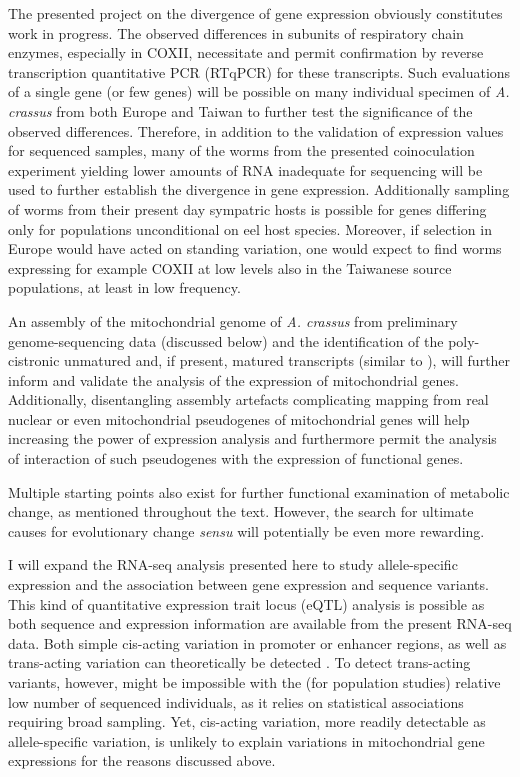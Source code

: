 The presented project on the divergence of gene expression obviously
constitutes work in progress. The observed differences in subunits of
respiratory chain enzymes, especially in COXII, necessitate and permit
confirmation by reverse transcription quantitative PCR (RTqPCR) for
these transcripts. Such evaluations of a single gene (or few genes)
will be possible on many individual specimen of \textit{A. crassus}
from both Europe and Taiwan to further test the significance of the
observed differences. Therefore, in addition to the validation of
expression values for sequenced samples, many of the worms from the
presented coinoculation experiment yielding lower amounts of RNA
inadequate for sequencing will be used to further establish the
divergence in gene expression. Additionally sampling of worms from
their present day sympatric hosts is possible for genes differing only
for populations unconditional on eel host species. Moreover, if
selection in Europe would have acted on standing variation, one would
expect to find worms expressing for example COXII at low levels also
in the Taiwanese source populations, at least in low frequency.

An assembly of the mitochondrial genome of \textit{A. crassus} from
preliminary genome-sequencing data (discussed below) and the
identification of the poly-cistronic unmatured and, if present,
matured transcripts (similar to \cite{pmid19843606}), will further
inform and validate the analysis of the expression of mitochondrial
genes. Additionally, disentangling assembly artefacts complicating
mapping from real nuclear or even mitochondrial \cite{pmid20026478}
pseudogenes of mitochondrial genes will help increasing the power of
expression analysis and furthermore permit the analysis of interaction
of such pseudogenes with the expression of functional genes.

Multiple starting points also exist for further functional examination
of metabolic change, as mentioned throughout the text. However, the
search for ultimate causes for evolutionary change \textit{sensu}
\cite{mayr1961cause} will potentially be even more rewarding.

I will expand the RNA-seq analysis presented here to study
allele-specific expression and the association between gene expression
and sequence variants. This kind of quantitative expression trait
locus (eQTL) analysis is possible as both sequence and expression
information are available from the present RNA-seq data. Both simple
cis-acting variation in promoter or enhancer regions, as well as
trans-acting variation can theoretically be detected
\cite{pmid21838806}. To detect trans-acting variants, however, might
be impossible with the (for population studies) relative low number of
sequenced individuals, as it relies on statistical associations
requiring broad sampling. Yet, cis-acting variation, more readily
detectable as allele-specific variation, is unlikely to explain
variations in mitochondrial gene expressions for the reasons discussed
above.

